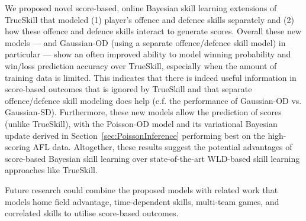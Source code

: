 We proposed novel score-based, online Bayesian skill learning extensions of
TrueSkill that modeled (1) player's offence and defence skills
separately and (2) how these offence and defence skills
interact to generate scores.  Overall these new models --- and
Gaussian-OD (using a separate offence/defence skill model) in particular ---
show an often improved ability to model winning probability and
win/loss prediction accuracy over TrueSkill, especially when the
amount of training data is limited.  This indicates that there is
indeed useful information in score-based outcomes that is ignored by
TrueSkill and that separate offence/defence skill modeling does help
(c.f. the performance of Gaussian-OD vs. Gaussian-SD).  Furthermore,
these new models allow the prediction of scores (unlike TrueSkill),
with the Poisson-OD model and its variational Bayesian update derived
in Section~\ref{sec:PoissonInference} performing best on the
high-scoring AFL data.  Altogether, these results suggest the
potential advantages of score-based Bayesian skill learning over
state-of-the-art WLD-based skill learning approaches like TrueSkill.

Future research could combine the proposed models with
related work that models home field advantage, time-dependent skills,
multi-team games, and correlated skills to utilise score-based
outcomes.